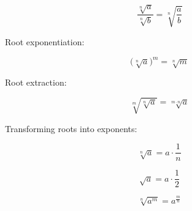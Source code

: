 \begin{definition}
    \begin{equation}
        \dfrac{\sqrt[n]{a}}{\sqrt[n]{b}} = \sqrt[n]{\dfrac{a}{b}} \label{eq-42}
    \end{equation}

    Root exponentiation:

    \begin{equation}
       \Big(\sqrt[n]{a}\Big)^m = \sqrt[n]{m} \label{eq-43}
    \end{equation}

    Root extraction: 

    \begin{equation}
        \sqrt[m]{\sqrt[n]{a}} = \sqrt[m \cdot n]{a} \label{eq-44}
    \end{equation}

    Transforming roots into exponents:

    \begin{equation}
        \sqrt[n]{a} = a \cdot \frac{1}{n} \label{eq-45}
    \end{equation}

    \begin{equation}
        \sqrt{a} = a \cdot \frac{1}{2} \label{eq-46}
    \end{equation}

    \begin{equation}
        \sqrt[n]{a^m} = a^\frac{m}{n} \label{eq-47}
    \end{equation}

\end{definition}


